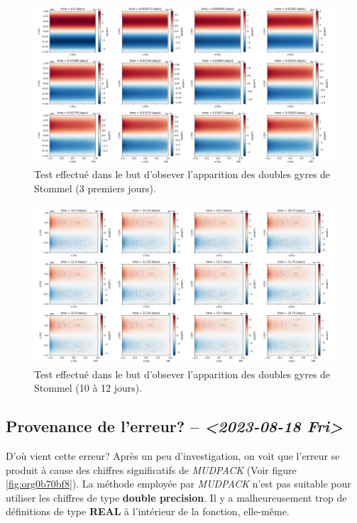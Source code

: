 \documentclass[10pt]{article}
\numberwithin{equation}{section}
\begin{document}
\begin{figure}[htbp]
\centering
\includegraphics[width=.9\linewidth]{figures/debuggage/2023_08_23_zetaBT_4filesperdays.png}
\caption{\label{fig:orgcf9fb4b}Test effectué dans le but d'obsever l'apparition des doubles gyres de Stommel (3 premiers jours).}
\end{figure}

\begin{figure}[htbp]
\centering
\includegraphics[width=.9\linewidth]{figures/debuggage/2023_08_23_zetaBT_4filesperdays2.png}
\caption{\label{fig:org1222627}Test effectué dans le but d'obsever l'apparition des doubles gyres de Stommel (10 à 12 jours).}
\end{figure}


\subsection{Provenance de l'erreur? -- \textit{<2023-08-18 Fri>}}
\label{sec:org873af03}
D'où vient cette erreur?
Après un peu d'investigation, on voit que l'erreur se produit à cause des chiffres significatifs de \emph{MUDPACK} (Voir figure \ref{fig:org0b70bf8}).
La  méthode employée par \emph{MUDPACK} n'est pas suitable pour utiliser les chiffres de type \textbf{double precision}.
Il y a malheureusement trop de définitions de type \textbf{REAL} à l'intérieur de la fonction, elle-même.
\end{document}

